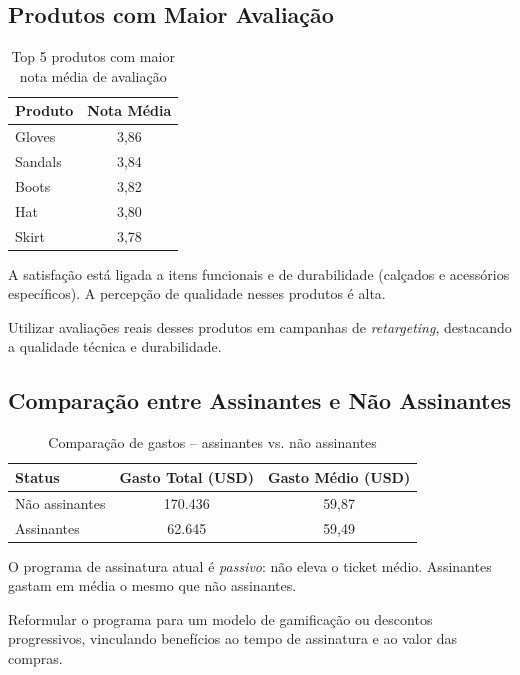 \documentclass[12pt,a4paper]{article}
\begin{document}
\subsection{Produtos com Maior Avaliação}
\begin{table}[H]
\centering
\caption{Top 5 produtos com maior nota média de avaliação}
\label{tab:top_avaliacoes}
\begin{tabular}{lc}
\toprule
\rowcolor{lightgray} \textbf{Produto} & \textbf{Nota Média} \\
\midrule
Gloves  & 3,86 \\
Sandals & 3,84 \\
Boots   & 3,82 \\
Hat     & 3,80 \\
Skirt   & 3,78 \\
\bottomrule
\end{tabular}
\end{table}

\begin{insightbox}
A satisfação está ligada a itens funcionais e de durabilidade (calçados e acessórios específicos). A percepção de qualidade nesses produtos é alta.
\end{insightbox}
\begin{actionbox}
Utilizar avaliações reais desses produtos em campanhas de \textit{retargeting}, destacando a qualidade técnica e durabilidade.
\end{actionbox}

\subsection{Comparação entre Assinantes e Não Assinantes}
\begin{table}[H]
\centering
\caption{Comparação de gastos – assinantes vs. não assinantes}
\label{tab:assinantes}
\begin{tabular}{lcc}
\toprule
\rowcolor{lightgray} \textbf{Status} & \textbf{Gasto Total (USD)} & \textbf{Gasto Médio (USD)} \\
\midrule
Não assinantes & 170.436 & 59,87 \\
Assinantes     & 62.645  & 59,49 \\
\bottomrule
\end{tabular}
\end{table}

\begin{insightbox}
O programa de assinatura atual é \textit{passivo}: não eleva o ticket médio. Assinantes gastam em média o mesmo que não assinantes.
\end{insightbox}
\begin{actionbox}
Reformular o programa para um modelo de gamificação ou descontos progressivos, vinculando benefícios ao tempo de assinatura e ao valor das compras.
\end{actionbox}
\end{document}
